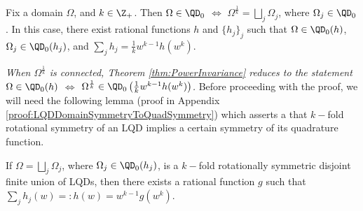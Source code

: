 \documentclass{article}
\numberwithin{equation}{section}
\begin{document}
\begin{theorem}\label{thm:PowerInvariance}
    Fix a domain $\Omega$, and $k\in\Z_{+}$. Then $\Omega\in\QD_0$ $\iff$ $\Omega^{\frac{1}{k}}=\bigsqcup_{j}\Omega_j$, where $\Omega_j\in\QD_0$. In this case, there exist rational functions $h$ and $\{h_j\}_j$ such that $\Omega\in\QD_0(h)$, $\Omega_j\in \QD_0(h_j)$, and $\sum_{j}h_j=\frac{1}{k}w^{k-1}h(w^k)$.
\end{theorem}
\emph{When $\Omega^{\frac{1}{k}}$ is connected, Theorem \ref{thm:PowerInvariance} reduces to the statement $\Omega\in\QD_0(h)$ $\iff$ $\Omega^{\frac{1}{k}}\in\QD_0\left(\frac{1}{k}w^{k-1}h(w^k)\right)$.} Before proceeding with the proof, we will need the following lemma (proof in Appendix \ref{proof:LQDDomainSymmetryToQuadSymmetry}) which asserts a that $k-$fold rotational symmetry of an LQD implies a certain symmetry of its quadrature function.
\begin{lemma}\label{lemma:LQDDomainSymmetryToQuadSymmetry}
If $\Omega=\bigsqcup_{j}\Omega_j$, where $\Omega_j\in\QD_0(h_j)$, is a $k-$fold rotationally symmetric disjoint finite union of LQDs, then there exists a rational function $g$ such that $\sum_{j}h_j(w)=:h(w)=w^{k-1}g(w^k)$. 
\end{lemma}
\end{document}

